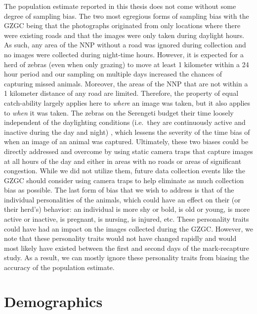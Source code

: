 The population estimate reported in this thesis does not come without some degree of sampling bias.  The two most egregious forms of sampling bias with the GZGC being that the photographs originated from only locations where there were existing roads and that the images were only taken during daylight hours.  As such, any area of the NNP without a road was ignored during collection and no images were collected during night-time hours.  However, it is expected for a herd of zebras (even when only grazing) to move at least 1 kilometer within a 24 hour period \cite{juang_energy-efficient_2002, rubenstein_chapter_2010} and our sampling on multiple days increased the chances of capturing missed animals.  Moreover, the areas of the NNP that are not within a 1 kilometer distance of any road are limited.  Therefore, the property of equal catch-ability \cite{seber_estimation_1982, white_program_1999} largely applies here to \textit{where} an image was taken, but it also applies to \textit{when} it was taken.  The zebras on the Serengeti budget their time loosely independent of the daylighting conditions (i.e.\ they are continuously active and inactive during the day and night) \cite{rubenstein_ecology_1994, becker_mother-infant_1990, kivai_feeding_2006}, which lessens the severity of the time bias of when an image of an animal was captured.  Ultimately, these two biases could be directly addressed and overcome by using static camera traps that capture images at all hours of the day and either in areas with no roads or areas of significant congestion.  While we did not utilize them, future data collection events like the GZGC should consider using camera traps to help eliminate as much collection bias as possible.  The last form of bias that we wish to address is that of the individual personalities of the animals, which could have an effect on their (or their herd's) behavior: an individual is more shy or bold, is old or young, is more active or inactive, is pregnant, is nursing, is injured, etc.  These personality traits could have had an impact on the images collected during the GZGC.  However, we note that these personality traits would not have changed rapidly and would most likely have existed between the first and second days of the mark-recapture study.  As a result, we can mostly ignore these personality traits from biasing the accuracy of the population estimate.

\section{Demographics}

